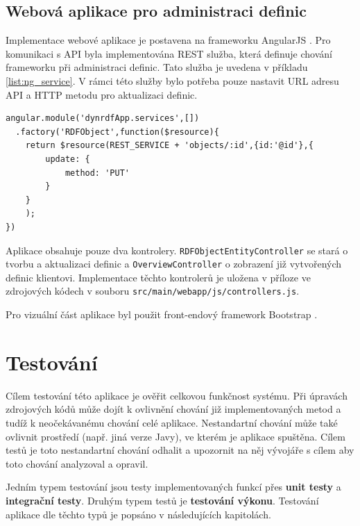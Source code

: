 \documentclass[thesis=B,czech]{FITthesis}[2012/06/26]
\begin{document}
  \section{Webová aplikace pro administraci definic}\label{impl_web}
  Implementace webové aplikace je postavena na frameworku AngularJS \cite{angular}.
  Pro komunikaci s API byla implementována REST služba, která definuje chování frameworku při administraci definic. Tato služba je uvedena v příkladu \ref{list:ng_service}.
  V rámci této služby bylo potřeba pouze nastavit URL adresu API a HTTP metodu pro aktualizaci definic.
  
    \begin{lstlisting}[float=htb,caption={Služba pro komunikaci s API ve webové aplikaci. Proměná REST\_SERVICE je definovaná globálně a jejím obsahem je adresa serveru pro dynamické generování},label=list:ng_service]
angular.module('dynrdfApp.services',[])
  .factory('RDFObject',function($resource){
    return $resource(REST_SERVICE + 'objects/:id',{id:'@id'},{
        update: {
            method: 'PUT'
        }
    }
    );
})
\end{lstlisting}
  
  
  Aplikace obsahuje pouze dva kontrolery. \texttt{RDFObjectEntityController} se stará o tvorbu a aktualizaci definic a \texttt{OverviewController}
  o zobrazení již vytvořených definic klientovi. 
  Implementace těchto kontrolerů je uložena v příloze ve zdrojových kódech v souboru \texttt{src/main/webapp/js/controllers.js}.
  
  Pro vizuální část aplikace byl použit front-endový framework Bootstrap \cite{bootstrap}.
  
  
  \chapter{Testování}  
  Cílem testování této aplikace je ověřit celkovou funkčnost systému.  
  Při úpravách zdrojových kódů může dojít k ovlivnění chování již implementovaných metod
  a tudíž k neočekávanému chování celé aplikace. Nestandartní chování může také ovlivnit prostředí (např. jiná verze Javy), ve kterém je aplikace spuštěna.
  Cílem testů je toto nestandartní chování odhalit a upozornit na něj vývojáře s cílem aby toto chování analyzoval a opravil.
  
  Jedním typem testování jsou testy implementovaných funkcí přes \textbf{unit testy} a \textbf{integrační testy}.
  Druhým typem testů je \textbf{testování výkonu}. Testování aplikace dle těchto typů je popsáno v následujících kapitolách.
    
\end{document}
